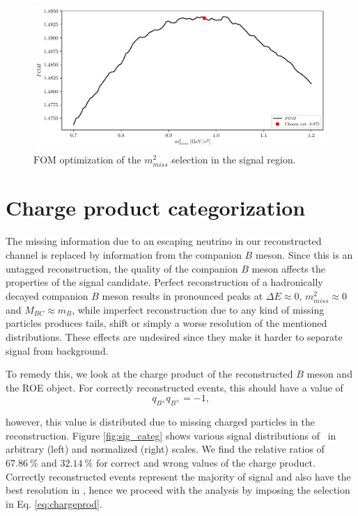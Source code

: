 \begin{figure}[H]
	\centering
	\captionsetup{width=0.8\linewidth}
	\includegraphics[width=\linewidth]{fig/missM2_precise}
	\caption{$\mathrm{FOM}$ optimization of the $m_{miss}^2$ selection in the signal region.}
	\label{fig:missm2opt}
\end{figure}

\section{Charge product categorization}\label{sec:event-categorization}

The missing information due to an escaping neutrino in our reconstructed channel is replaced by information from the companion $B$ meson. Since this is an untagged reconstruction, the quality of the companion $B$ meson affects the properties of the signal candidate. Perfect reconstruction of a hadronically decayed companion $B$ meson results in pronounced peaks at $\Delta E \approx 0$, $m_{miss}^2 \approx 0$ and $M_{BC} \approx m_B$, while imperfect reconstruction due to any kind of missing particles produces tails, shift or simply a worse resolution of the mentioned distributions. These effects are undesired since they make it harder to separate signal from background.

To remedy this, we look at the charge product of the reconstructed $B$ meson and the ROE object. For correctly reconstructed events, this should have a value of 
\begin{equation}
\label{eq:chargeprod}
q_{B^\pm}q_{B^\mp} = -1,
\end{equation}

however, this value is distributed due to missing charged particles in the reconstruction. Figure \ref{fig:sig_categ} shows various signal distributions of \vars~in arbitrary (left) and normalized (right) scales. We find the relative ratios of $67.86~\%$ and $32.14~\%$ for correct and wrong values of the charge product. Correctly reconstructed events represent the majority of signal and also have the best resolution in \vars, hence we proceed with the analysis by imposing the selection in Eq. \ref{eq:chargeprod}.

